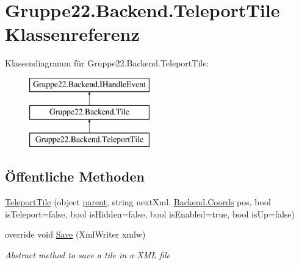 \hypertarget{class_gruppe22_1_1_backend_1_1_teleport_tile}{\section{Gruppe22.\-Backend.\-Teleport\-Tile Klassenreferenz}
\label{class_gruppe22_1_1_backend_1_1_teleport_tile}
}
Klassendiagramm für Gruppe22.\-Backend.\-Teleport\-Tile\-:\begin{figure}[H]
\begin{center}
\leavevmode
\includegraphics[height=3.000000cm]{class_gruppe22_1_1_backend_1_1_teleport_tile}
\end{center}
\end{figure}
\subsection*{Öffentliche Methoden}
\begin{DoxyCompactItemize}
\item 
\hyperlink{class_gruppe22_1_1_backend_1_1_teleport_tile_a075d6c22572655624590fd57147e66d3}{Teleport\-Tile} (object \hyperlink{class_gruppe22_1_1_backend_1_1_tile_abc12933c70eb3a2ebbb2fde9f45c2632}{parent}, string next\-Xml, \hyperlink{class_gruppe22_1_1_backend_1_1_coords}{Backend.\-Coords} pos, bool is\-Teleport=false, bool is\-Hidden=false, bool is\-Enabled=true, bool is\-Up=false)
\item 
override void \hyperlink{class_gruppe22_1_1_backend_1_1_teleport_tile_a15a8abf308bcb1577fdea70a4959bf79}{Save} (Xml\-Writer xmlw)
\begin{DoxyCompactList}\small\item\em Abstract method to save a tile in a X\-M\-L file \end{DoxyCompactList}\end{DoxyCompactItemize}
